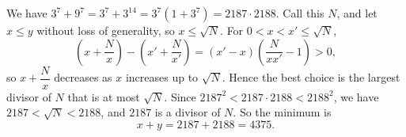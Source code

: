 We have $3^7+9^7=3^7+3^{14}=3^7\left(1+3^7\right)=2187\cdot2188$. Call this $N$, and let $x\le y$ without loss of generality, so $x\le\sqrt N$. For $0<x<x'\le\sqrt N$,
\[\left(x+\dfrac Nx\right)-\left(x'+\dfrac N{x'}\right)=(x'-x)\left(\dfrac{N}{xx'}-1\right)>0,\]
so $x+\dfrac Nx$ decreases as $x$ increases up to $\sqrt N$. Hence the best choice is the largest divisor of $N$ that is at most $\sqrt N$. Since $2187^2<2187\cdot2188<2188^2$, we have $2187<\sqrt N<2188$, and $2187$ is a divisor of $N$. So the minimum is
\[x+y=2187+2188=\boxed{4375}.\]
